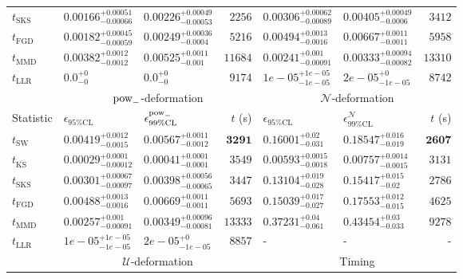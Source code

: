 \begin{tabular}{l|llr|llr}
	$t_{\mathrm{SKS}}$ & $0.00166_{-0.00066}^{+0.00051}$ & $0.00226_{-0.00053}^{+0.00049}$ & $2256$ & $0.00306_{-0.00089}^{+0.00062}$ & $0.00405_{-0.0006}^{+0.00049}$ & $3412$ \\
	$t_{\mathrm{FGD}}$ & $0.00182_{-0.00059}^{+0.00045}$ & $0.00249_{-0.0004}^{+0.00036}$ & $5216$ & $0.00494_{-0.0016}^{+0.0013}$ & $0.00667_{-0.0011}^{+0.0011}$ & $5958$ \\
	$t_{\mathrm{MMD}}$ & $0.00382_{-0.0012}^{+0.0012}$ & $0.00525_{-0.001}^{+0.0011}$ & $11684$ & $0.00241_{-0.00091}^{+0.001}$ & $0.00333_{-0.00082}^{+0.00094}$ & $13310$ \\
	$t_{\mathrm{LLR}}$ & $0.0_{-0}^{+0}$ & $0.0_{-0}^{+0}$ & $9174$ & $1e-05_{-1e-05}^{+1e-05}$ & $2e-05_{-1e-05}^{+0}$ & $8742$ \\
	\toprule
	\multicolumn{1}{c}{} & \multicolumn{3}{c}{$\rm{pow}_{-}$-deformation} & \multicolumn{3}{c}{$\mathcal{N}$-deformation} \\
	Statistic & $\epsilon_{95\%\mathrm{CL}}$ & $\epsilon^  {\rm{pow}_{-}}_{99\%\mathrm{CL}}$ & $t$ (s) & $\epsilon_{95\%\mathrm{CL}}$ & $\epsilon^    {\mathcal{N}}_{99\%\mathrm{CL}}$ & $t$ (s) \\
	\midrule
	$t_{\mathrm{SW}}$ & $0.00419_{-0.0015}^{+0.0012}$ & $0.00567_{-0.0012}^{+0.0011}$ & ${\mathbf{3291}}$ & $0.16001_{-0.031}^{+0.02}$ & $0.18547_{-0.019}^{+0.016}$ & ${\mathbf{2607}}$ \\
	$t_{\overline{\mathrm{KS}}}$ & ${\mathbf{0.00029_{-0.00012}^{+0.0001}}}$ & ${\mathbf{0.00041_{-0.0001}^{+0.0001}}}$ & $3549$ & ${\mathbf{0.00593_{-0.0018}^{+0.0015}}}$ & ${\mathbf{0.00757_{-0.0015}^{+0.0014}}}$ & $3131$ \\
	$t_{\mathrm{SKS}}$ & $0.00301_{-0.00097}^{+0.00067}$ & $0.00398_{-0.00065}^{+0.00056}$ & $3447$ & $0.13104_{-0.028}^{+0.019}$ & $0.15417_{-0.02}^{+0.015}$ & $2786$ \\
	$t_{\mathrm{FGD}}$ & $0.00488_{-0.0016}^{+0.0013}$ & $0.00669_{-0.0011}^{+0.0011}$ & $5693$ & $0.15039_{-0.027}^{+0.017}$ & $0.17553_{-0.015}^{+0.012}$ & $4625$ \\
	$t_{\mathrm{MMD}}$ & $0.00257_{-0.00091}^{+0.001}$ & $0.00349_{-0.00081}^{+0.00096}$ & $13333$ & $0.37231_{-0.061}^{+0.04}$ & $0.43454_{-0.033}^{+0.03}$ & $9278$ \\
	$t_{\mathrm{LLR}}$ & $1e-05_{-1e-05}^{+1e-05}$ & $2e-05_{-1e-05}^{+0}$ & $8857$ & - & - & - \\
	\toprule
	\multicolumn{1}{c}{} & \multicolumn{3}{c}{$\mathcal{U}$-deformation} & \multicolumn{3}{c}{Timing} \\

\end{tabular}
